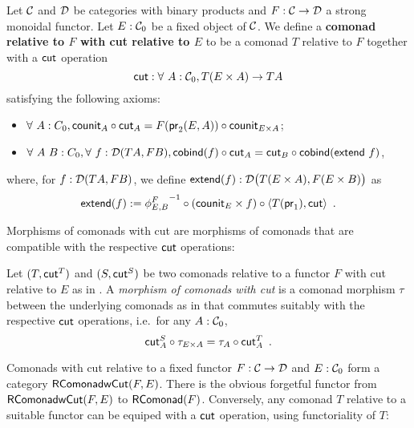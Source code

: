 \documentclass[conference,10pt]{IEEEtran}
\newcommand{\fat}[1]{\textbf{#1}}
\renewcommand{\alpha}{\phi}
\begin{document}
\begin{definition}\label{def:rel_comonad_with_cut}
 Let $\C$ and $\D$ be categories with binary products and $F:\C\to\D$ a strong monoidal functor. Let $E:\C_0$ be a fixed object of $\C$.
 We define a \fat{comonad relative to $F$ with cut relative to $E$} to be a comonad $T$ relative to $F$ together with a $\cut$ operation 
    \[ \cut : \forall~A:\C_0, T(E\times A) \to TA \]
 satisfying the following axioms:
  \begin{itemize}
   \item $\forall~A:C_0, \comp{\cut_A}{\counit_A} = \comp{\counit_{E\times A}}{F(\pr_2(E,A))}$;
   \item $\forall~A~B:C_0,\forall~f:\D(TA,FB), \comp{\cut_A}{\cobind(f)} = \comp{\cobind(\extend~f)}{\cut_B}$,
  \end{itemize}

  \noindent
  where, for $f:\D(TA,FB)$, we define $\extend(f) : \D\bigl(T(E\times A),F(E\times B)\bigr)$ as
       \[ \extend(f) := \comp{\comp{\langle T(\pr_1) , \cut \rangle}{(\counit_E\times f)}}{{\alpha^{F}_{E,B}}^{-1}} \enspace . \]
  
\end{definition}

Morphisms of comonads with cut are morphisms of comonads that are compatible with the respective $\cut$ operations:

\begin{definition}\label{def:morphism_comonad_cut}
 Let $(T,\cut^T)$ and $(S,\cut^S)$ be two comonads relative to a functor $F$ with cut relative to $E$ as in .
 A \emph{morphism of comonads with cut} is a comonad morphism $\tau$ between the underlying comonads as in  that 
 commutes suitably with the respective $\cut$ operations, i.e.\ for any $A : \C_0$,
  \[ \comp{\tau_{E \times A}}{\cut^S_A}  = \comp{\cut^T_A}{\tau_A} \enspace . \]
\end{definition}


Comonads with cut relative to a fixed functor $F:\C\to\D$ and $E:\C_0$ form a category $\RComonadWC(F,E)$.
There is the obvious forgetful functor from $\RComonadWC(F,E)$ to $\RComonad(F)$.
Conversely, any comonad $T$ relative to a suitable functor can be equiped with a $\cut$ operation, using functoriality of $T$:
\end{document}
